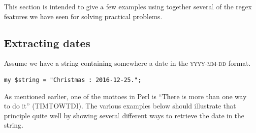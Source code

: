 This section is intended to give a few examples using together 
several of the regex features we have seen for solving practical 
problems.

\subsection{Extracting dates}
\label{extracting_dates}

Assume we have a string containing somewhere a 
date in the \textsc{yyyy-mm-dd} format.

\begin{verbatim}
my $string = "Christmas : 2016-12-25.";
\end{verbatim}
%

As mentioned earlier, one of the mottoes in Perl is ``There 
is more than one way to do it'' (TIMTOWTDI). The various 
examples below should illustrate that principle quite well 
by showing several different ways to retrieve the date in 
the string.

